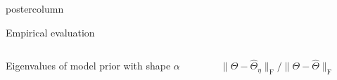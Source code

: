 \documentclass[final,hyperref={pdfpagelabels=false}]{beamer}
\begin{document}
\begin{frame}
\begin{columns}
\begin{column}{.49\textwidth}
\begin{beamercolorbox}[center,wd=\textwidth]{postercolumn}
\begin{minipage}[T]{.95\textwidth}
{\begin{block}{Empirical evaluation}
\begin{columns}
\begin{column}{.25\textwidth}
\begin{center}
    {\tiny Eigenvalues of model prior with shape $\alpha$}
    \vspace{-0.5em}

    \end{center}


   \end{column}
   \begin{column}{.40\textwidth}
   \begin{center}
  {\tiny $\| \Theta - \hat \Theta_\eta\|_\mathrm{F} / \| \Theta - \hat \Theta \|_\mathrm{F}$}
    \vspace{-0.5em}



\end{center}
\end{column}
\end{columns}
\end{block}}
\end{minipage}
\end{beamercolorbox}
\end{column}
\end{columns}
\end{frame}
\end{document}
